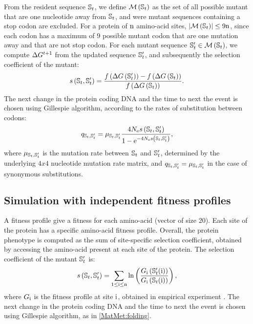 \documentclass{article}
\begin{document}
From the resident sequence $\mathbb{S}_{t}$, we define $\mathcal{M}\left(\mathbb{S}_{t}\right)$ as the set of all possible mutant that are one nucleotide away from $\mathbb{S}_{t}$, and were mutant sequences containing a stop codon are excluded.
For a protein of $\text{n}$ amino-acid sites, $\left| \mathcal{M}\left(\mathbb{S}_{t}\right) \right| \leq 9 \text{n}$, since each codon has a maximum of $9$ possible mutant codon that are one mutation away and that are not stop codon.
For each mutant sequence $\mathbb{S}_{t}' \in \mathcal{M}\left(\mathbb{S}_{t}\right)$, we compute $\Delta G^{t+1}$ from the updated sequence $\mathbb{S}_{t}'$, and subsequently the selection coefficient of the mutant:
\begin{equation}
s \left( \mathbb{S}_{t},\mathbb{S}_{t}'\right) = \dfrac{ f\left( \Delta G \left(\mathbb{S}_{t}'\right) \right) - f\left( \Delta G \left(\mathbb{S}_{t}\right) \right)}{f\left( \Delta G \left(\mathbb{S}_{t}\right) \right)}.
\end{equation}
The next change in the protein coding DNA and the time to next the event is chosen using Gillespie algorithm, according to the rates of substitution between codons:
\begin{equation}
q_{\mathbb{S}_{t}, \mathbb{S}_{t}'} = \mu_{\mathbb{S}_{t}, \mathbb{S}_{t}'} \dfrac{4 N_{\mathrm{e}} s \left( \mathbb{S}_{t},\mathbb{S}_{t}'\right)}{1 - \mathrm{e}^{-4 N_{\mathrm{e}} s \left( \mathbb{S}_{t},\mathbb{S}_{t}'\right)}}, 
\end{equation}
where $\mu_{\mathbb{S}_{t}, \mathbb{S}_{t}'}$ is the mutation rate between $\mathbb{S}_{t}$ and $\mathbb{S}_{t}'$, determined by the underlying $4x4$ nucleotide mutation rate matrix, and ${q_{\mathbb{S}_{t}, \mathbb{S}_{t}'}} = \mu_{\mathbb{S}_{t}, \mathbb{S}_{t}'}$ in the case of synonymous substitutions.

\subsection*{Simulation with independent fitness profiles}
A fitness profile give a fitness for each amino-acid (vector of size $20$).
Each site of the protein has a specific amino-acid fitness profile.
Overall, the protein phenotype is computed as the sum of site-specific selection coefficient, obtained by accessing the amino-acid present at each site of the protein.
The selection coefficient of the mutant $\mathbb{S}_{t}'$ is:
\begin{equation}
s \left( \mathbb{S}_{t},\mathbb{S}_{t}'\right) = \sum_{1 \leq \text{i} \leq \text{n}} \ln \left( \dfrac{G_{\text{i}} \left(\mathbb{S}_{t}'(\text{i}) \right)}{G_{\text{i}} \left(\mathbb{S}_{t}(\text{i}) \right)} \right) ,
\end{equation}
where $G_{\text{i}}$ is the fitness profile at site $\text{i}$, obtained in empirical experiment \cite{Bloom2017}.
The next change in the protein coding DNA and the time to next the event is chosen using Gillespie algorithm, as in \ref{MatMet:folding}.
\end{document}
